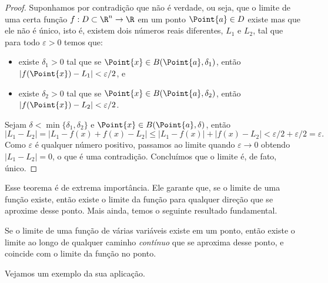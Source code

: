 \begin{proof}
Suponhamos por contradição que não é verdade, ou seja, que o limite de uma certa função $f:D\subset\R^n\to\R$ em um ponto $\Point{a}\in D$ existe mas que ele não é único, isto é, existem dois números reais diferentes, $L_1$ e $L_2$, tal que para todo $\varepsilon>0$ temos que: 
\begin{itemize}[label=\color{resultscolor!150}\textbullet]
\item existe $\delta_1>0$ tal que se $\Point{x}\in B(\Point{a},\delta_1)$, então $|f(\Point{x})-L_1|<\varepsilon/2$, e
\item existe $\delta_2>0$ tal que se $\Point{x}\in B(\Point{a},\delta_2)$, então $|f(\Point{x})-L_2|<\varepsilon/2$.
\end{itemize}
Sejam $\delta<\min\{\delta_1,\delta_2\}$ e $\Point{x}\in B(\Point{a},\delta)$, então
$$|L_1-L_2|=|L_1-f(x)+f(x)-L_2|\leq |L_1-f(x)|+|f(x)-L_2| < \varepsilon/2 + \varepsilon/2=\varepsilon.$$
Como $\varepsilon$ é qualquer número positivo, passamos ao limite quando $\varepsilon\rightarrow 0$ obtendo $|L_1-L_2|=0$, o que é uma contradição. Concluímos que o limite é, de fato, único. 
\end{proof}

Esse teorema é de extrema importância. Ele garante que, se o limite de uma função existe, então existe o limite da função para qualquer direção que se aproxime desse ponto. Mais ainda, temos o seguinte resultado fundamental.  
\begin{corollary}{}{}
    Se o limite de uma função de várias variáveis existe em um ponto, então existe o limite ao longo de qualquer caminho \textit{contínuo} que se aproxima desse ponto, e coincide com o limite da função no ponto.  
\end{corollary}



Vejamos um exemplo da sua aplicação. 

